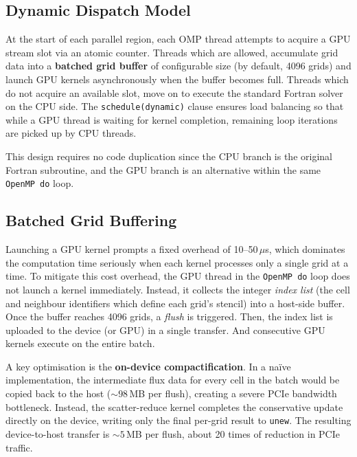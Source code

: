 \documentclass[fleqn,usenatbib]{mnras}
\newcommand{\code}[1]{\texttt{#1}}
\begin{document}
\subsection{Dynamic Dispatch Model}
\label{sec:hybrid_dispatch}

At the start of each parallel region, each OMP thread attempts to acquire a GPU stream slot via an atomic counter.  Threads which are allowed, accumulate grid data into a \textbf{batched grid buffer} of configurable size (by default, 4096 grids) and launch GPU kernels asynchronously when the buffer becomes full.  Threads which do not acquire an available slot, move on to execute the standard Fortran solver on the CPU side.  The \code{schedule(dynamic)} clause ensures load balancing so that while a GPU thread is waiting for kernel completion, remaining loop iterations are picked up by CPU threads.

This design requires no code duplication since the CPU branch is the
original Fortran subroutine, and the GPU branch is an alternative
within the same \texttt{OpenMP do} loop.

\subsection{Batched Grid Buffering}
\label{sec:hybrid_superbatch}

Launching a GPU kernel prompts a fixed overhead of 10--50\,$\mu$s, which dominates the computation time seriously when each kernel processes only a single grid at a time.  To mitigate this cost overhead, the GPU thread in the
\code{OpenMP do} loop does not launch a kernel immediately.  Instead,
it collects the integer \emph{index list} (the
cell and neighbour identifiers which define each grid's stencil) into
a host-side buffer.  Once the buffer reaches 4096 grids, a
\emph{flush} is triggered. Then, the index list is uploaded to the device (or GPU) in a single transfer. And consecutive GPU kernels execute on the entire batch.

A key optimisation is the \textbf{on-device compactification}.  In a na\"{i}ve
implementation, the intermediate flux data for every cell in the batch
would be copied back to the host (${\sim}98$\,MB per flush), creating
a severe PCIe bandwidth bottleneck.
Instead, the scatter-reduce kernel completes the conservative update
directly on the device, writing only the final per-grid result to
\code{unew}.  The resulting device-to-host transfer is
${\sim}5$\,MB per flush, about 20 times of reduction in PCIe traffic.
\end{document}
